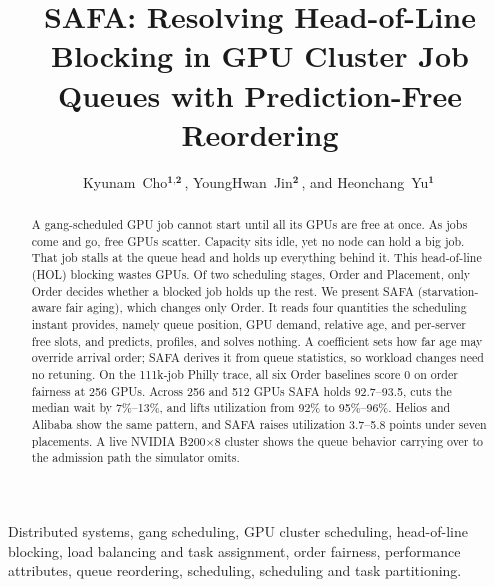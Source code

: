 \documentclass{ieeetj}
\def\authorrefmark#1{\ensuremath{^{\textbf{#1}}}}
\begin{document}


\title{SAFA: Resolving Head-of-Line Blocking in GPU Cluster Job Queues with Prediction-Free Reordering}

\author{Kyunam~Cho\authorrefmark{1,2}\,, YoungHwan~Jin\authorrefmark{2}\,, and Heonchang~Yu\authorrefmark{1}\,}

\begin{abstract}
A gang-scheduled GPU job cannot start until all its GPUs are free at once. As jobs come and go, free GPUs scatter. Capacity sits idle, yet no node can hold a big job. That job stalls at the queue head and holds up everything behind it. This head-of-line (HOL) blocking wastes GPUs. Of two scheduling stages, Order and Placement, only Order decides whether a blocked job holds up the rest. We present SAFA (starvation-aware fair aging), which changes only Order. It reads four quantities the scheduling instant provides, namely queue position, GPU demand, relative age, and per-server free slots, and predicts, profiles, and solves nothing. A coefficient sets how far age may override arrival order; SAFA derives it from queue statistics, so workload changes need no retuning. On the 111k-job Philly trace, all six Order baselines score 0 on order fairness at 256 GPUs. Across 256 and 512 GPUs SAFA holds 92.7--93.5, cuts the median wait by 7\%--13\%, and lifts utilization from 92\% to 95\%--96\%. Helios and Alibaba show the same pattern, and SAFA raises utilization 3.7--5.8 points under seven placements. A live NVIDIA B200$\times$8 cluster shows the queue behavior carrying over to the admission path the simulator omits.
\end{abstract}

\begin{IEEEkeywords}
Distributed systems, gang scheduling, GPU cluster scheduling, head-of-line blocking, load balancing and task assignment, order fairness, performance attributes, queue reordering, scheduling, scheduling and task partitioning.
\end{IEEEkeywords}
\end{document}
